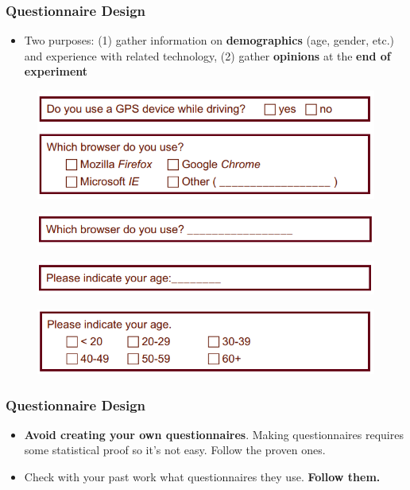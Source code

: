 \documentclass{beamer}
\begin{document}
\begin{frame}
	\frametitle{Questionnaire Design}
	\begin{itemize}
		\item Two purposes: (1) gather information on \textbf{demographics} (age, gender, etc.) and experience with related technology, (2) gather \textbf{opinions} at the \textbf{end of experiment}
	\end{itemize}
		\centering
		\begin{figure}
			\includegraphics[width=0.5\linewidth]{gps}
		\end{figure}
		\begin{figure}
			\includegraphics[width=0.5\linewidth]{browser}
		\end{figure}
		\begin{figure}
			\includegraphics[width=0.5\linewidth]{age}
		\end{figure}
		\begin{figure}
			\includegraphics[width=0.5\linewidth]{age2}
		\end{figure}
\end{frame}

\begin{frame}
	\frametitle{Questionnaire Design}
	\begin{itemize}
		\item \textbf{Avoid creating your own questionnaires}.  Making questionnaires requires some statistical proof so it's not easy.   Follow the proven ones.
		\item Check with your past work what questionnaires they use.  \textbf{ Follow them.}
	\end{itemize}
\end{frame}
\end{document}
